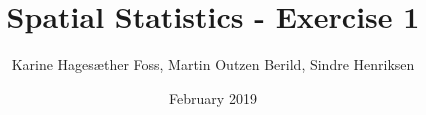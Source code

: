 \documentclass[11pt,a4paper,oneside]{article}
\title{Spatial Statistics - Exercise 1}
\author{Karine Hagesæther Foss, Martin Outzen Berild, Sindre Henriksen}
\date{February 2019}
\begin{document}
\maketitle

\section{}
\label{sec:problem1}


\section{}
\label{sec:problem2}


\section{}
\label{sec:problem3}

\end{document}
